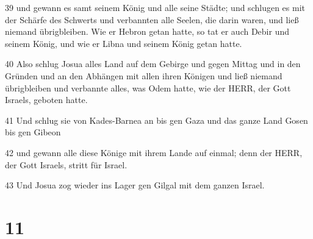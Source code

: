 \par 39 und gewann es samt seinem König und alle seine Städte; und schlugen es mit der Schärfe des Schwerts und verbannten alle Seelen, die darin waren, und ließ niemand übrigbleiben. Wie er Hebron getan hatte, so tat er auch Debir und seinem König, und wie er Libna und seinem König getan hatte.
\par 40 Also schlug Josua alles Land auf dem Gebirge und gegen Mittag und in den Gründen und an den Abhängen mit allen ihren Königen und ließ niemand übrigbleiben und verbannte alles, was Odem hatte, wie der HERR, der Gott Israels, geboten hatte.
\par 41 Und schlug sie von Kades-Barnea an bis gen Gaza und das ganze Land Gosen bis gen Gibeon
\par 42 und gewann alle diese Könige mit ihrem Lande auf einmal; denn der HERR, der Gott Israels, stritt für Israel.
\par 43 Und Josua zog wieder ins Lager gen Gilgal mit dem ganzen Israel.

\chapter{11}

